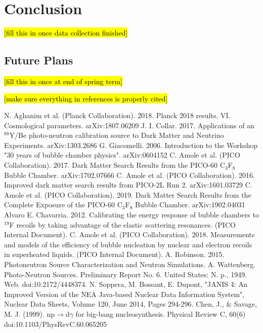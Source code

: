 \documentclass[%
12pt,
twoside,
reprint,
amsmath,amssymb,
aps,
]{article}
\begin{document}
	\section{Conclusion}
	\hl{[fill this in once data collection finished]}
	
	\subsection{Future Plans}
	\hl{[fill this in once at end of spring term]}
	
	\pagebreak
	\noindent \hl{[make sure everything in references is properly cited]}
	\begin{thebibliography}{1}
		 N. Aghanim et al. (Planck Collaboration). 2018. Planck 2018 results. VI. Cosmological parameters. arXiv:1807.06209 
		 J. I. Collar. 2017. Applications of an $^{88}$Y/Be photo-neutron calibration source
		to Dark Matter and Neutrino Experiments. arXiv:1303.2686
		 G. Giacomelli. 2006. Introduction to the Workshop "30 years of bubble chamber physics". arXiv:0604152
		 C. Amole et al. (PICO Collaboration). 2017. Dark Matter Search Results from the PICO-60 C$_{3}$F$_{8}$ Bubble Chamber. arXiv:1702.07666 
		 C. Amole et al. (PICO Collaboration). 2016. Improved dark matter search results from PICO-2L Run 2. arXiv:1601.03729
		 C. Amole et al. (PICO Collaboration). 2019. Dark Matter Search Results from the  Complete Exposure of the PICO-60 C$_{3}$F$_{8}$ Bubble Chamber. arXiv:1902.04031 
		 Alvaro E. Chavarria. 2012. Calibrating the energy response of bubble chambers to $^{19}$F recoils by taking advantage of the elastic scattering resonances. (PICO Internal Document).
		 C. Amole et al. (PICO Collaboration). 2018. Measurements and models of the efficiency of bubble nucleation by nuclear and electron recoils in superheated liquids. (PICO Internal Document).
		 A. Robinson. 2015. Photoneutron Source Characterization and Neutron Simulations.
		 A. Wattenberg. Photo-Neutron Sources. Preliminary Report No. 6. United States: N. p., 1949. Web. doi:10.2172/4448374.
		 N. Soppera, M. Bossant, E. Dupont, "JANIS 4: An Improved Version of the NEA Java-based Nuclear Data Information System", Nuclear Data Sheets, Volume 120, June 2014, Pages 294-296.
		 Chen, J., \& Savage, M. J. (1999). np$\rightarrow$d$\gamma$ for big-bang nucleosynthesis. Physical Review C, 60(6) doi:10.1103/PhysRevC.60.065205
		
	\end{thebibliography}
\end{document}
